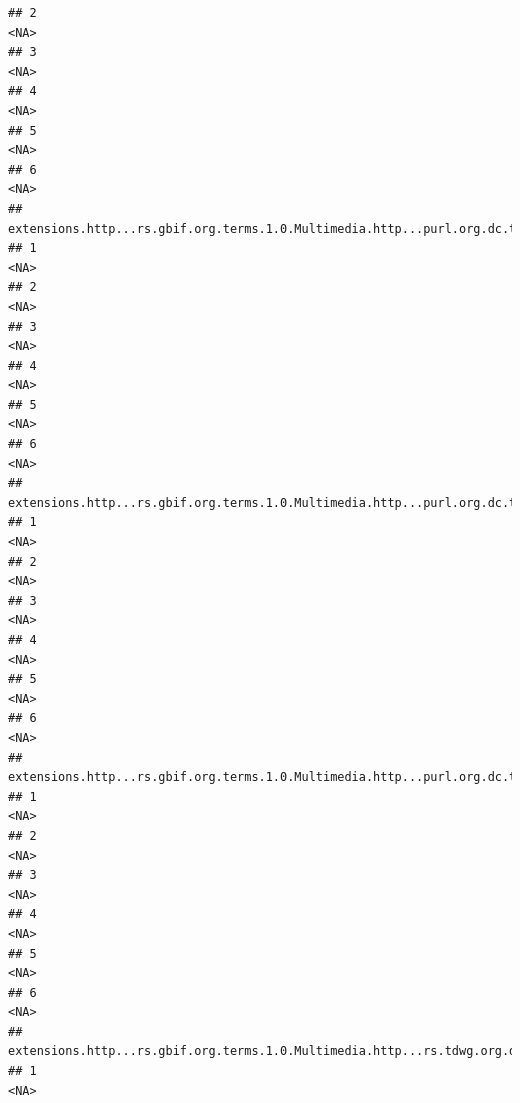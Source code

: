 \documentclass[
]{book}
\begin{document}
\begin{verbatim}
## 2                                                                                  <NA>
## 3                                                                                  <NA>
## 4                                                                                  <NA>
## 5                                                                                  <NA>
## 6                                                                                  <NA>
##   extensions.http...rs.gbif.org.terms.1.0.Multimedia.http...purl.org.dc.terms.rightsHolder.8
## 1                                                                                       <NA>
## 2                                                                                       <NA>
## 3                                                                                       <NA>
## 4                                                                                       <NA>
## 5                                                                                       <NA>
## 6                                                                                       <NA>
##   extensions.http...rs.gbif.org.terms.1.0.Multimedia.http...purl.org.dc.terms.identifier.8
## 1                                                                                     <NA>
## 2                                                                                     <NA>
## 3                                                                                     <NA>
## 4                                                                                     <NA>
## 5                                                                                     <NA>
## 6                                                                                     <NA>
##   extensions.http...rs.gbif.org.terms.1.0.Multimedia.http...purl.org.dc.terms.type.8
## 1                                                                               <NA>
## 2                                                                               <NA>
## 3                                                                               <NA>
## 4                                                                               <NA>
## 5                                                                               <NA>
## 6                                                                               <NA>
##   extensions.http...rs.gbif.org.terms.1.0.Multimedia.http...rs.tdwg.org.dwc.terms.catalogNumber.8
## 1                                                                                            <NA>

\end{verbatim}
\end{document}
